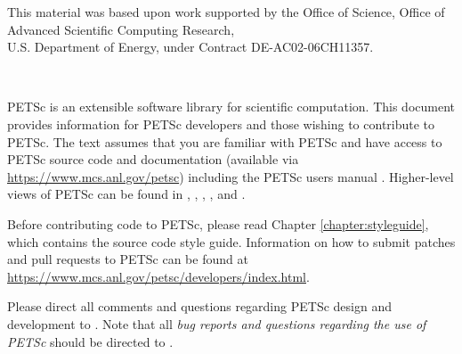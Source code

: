 \vspace*{20pt}
\noindent This material was based upon work supported by the Office of Science, Office of Advanced Scientific Computing Research, \\
U.S. Department of Energy, under Contract DE-AC02-06CH11357.


\newpage

\hbox{ }

\vspace{1in}
\date{\today}

\pagestyle{empty}
\newpage

\medskip \medskip

%
%

\medskip \medskip
PETSc is an extensible software library for scientific
computation. This document provides information for PETSc
developers and those wishing to contribute to PETSc. The text assumes
that you are familiar with PETSc and have access to PETSc source code
and documentation (available
via \href{https://www.mcs.anl.gov/petsc}{https://www.mcs.anl.gov/petsc}) including the PETSc users manual \cite{petsc-user-ref}.
Higher-level views of PETSc can be found in \cite{s2011}, \cite{bgms00}, \cite{miss-paper}, \cite{bgms98}, and \cite{petsc-efficient}. 

Before contributing code to PETSc, please read Chapter \ref{chapter:styleguide}, which contains the source code style guide.
Information on how to submit patches and pull requests to PETSc can be found at
\href{https://www.mcs.anl.gov/petsc/developers/index.html}{https://www.mcs.anl.gov/petsc/developers/index.html}.

\vspace{1cm}

Please direct all comments and questions regarding PETSc design and
development to .  Note that all {\em
bug reports and questions regarding the use of PETSc} should
be directed to .

%
%

\newpage
\hbox{ }
\newpage

